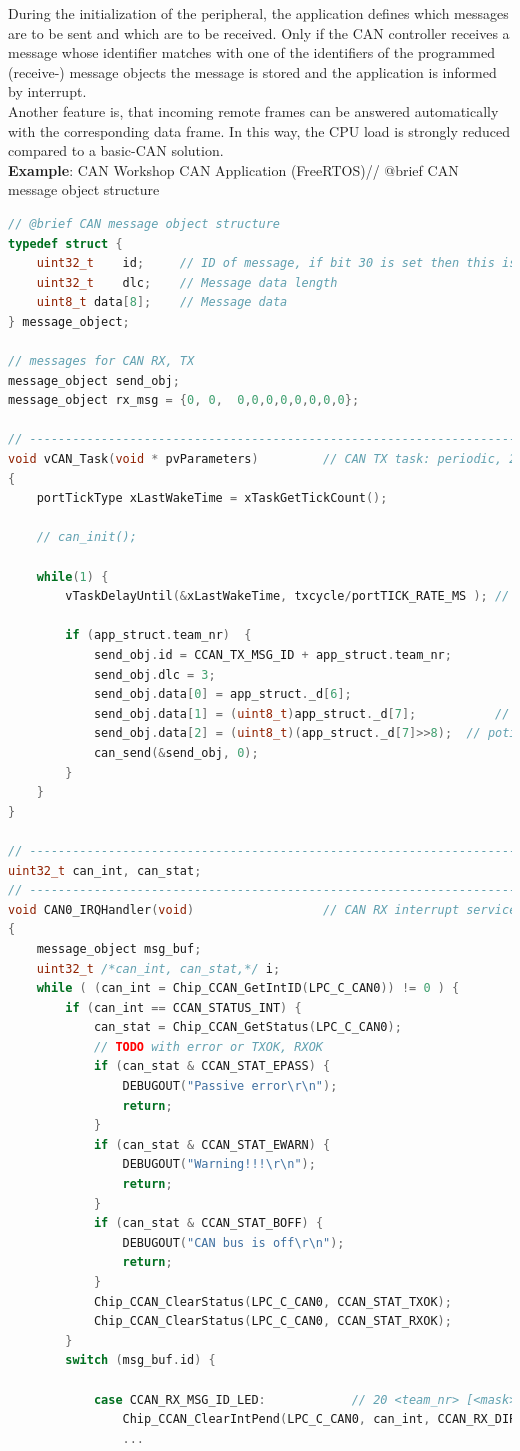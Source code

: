 During the initialization of the peripheral, the application defines which messages are to be sent and which are to be received. Only if the CAN controller receives a message whose identifier matches with one of the identifiers of the programmed (receive-) message objects the message is stored and the application is informed by interrupt. \\

Another feature is, that incoming remote frames can be answered automatically with the corresponding data frame. In this way, the CPU load is strongly reduced compared to a basic-CAN solution.\\
\newpage
\textbf{ Example}: CAN Workshop CAN Application (FreeRTOS)// @brief CAN message object structure\\

\begin{lstlisting}[style=mystyle, language=c]
// @brief CAN message object structure
typedef struct {
	uint32_t    id;		// ID of message, if bit 30 is set then this is extended frame */
	uint32_t    dlc;	// Message data length
	uint8_t data[8];	// Message data 
} message_object;

// messages for CAN RX, TX
message_object send_obj;
message_object rx_msg = {0, 0,  0,0,0,0,0,0,0,0};

// ----------------------------------------------------------------------------
void vCAN_Task(void * pvParameters) 		// CAN TX task: periodic, 20 ms
{
	portTickType xLastWakeTime = xTaskGetTickCount();

	// can_init();

	while(1) {
		vTaskDelayUntil(&xLastWakeTime, txcycle/portTICK_RATE_MS ); // 20 ms

		if (app_struct.team_nr)  {										// with team_nr set to > 0
			send_obj.id = CCAN_TX_MSG_ID + app_struct.team_nr;
			send_obj.dlc = 3; 												// 3 data bytes
			send_obj.data[0] = app_struct._d[6];						// joystick state
			send_obj.data[1] = (uint8_t)app_struct._d[7];			// poti LSB
			send_obj.data[2] = (uint8_t)(app_struct._d[7]>>8);	// poti MSB
			can_send(&send_obj, 0);
		}
	}	
}

// ----------------------------------------------------------------------------
uint32_t can_int, can_stat;					
// ----------------------------------------------------------------------------
void CAN0_IRQHandler(void) 					// CAN RX interrupt service routine:
{
	message_object msg_buf;
	uint32_t /*can_int, can_stat,*/ i;
	while ( (can_int = Chip_CCAN_GetIntID(LPC_C_CAN0)) != 0 ) {
		if (can_int == CCAN_STATUS_INT) {
			can_stat = Chip_CCAN_GetStatus(LPC_C_CAN0);
			// TODO with error or TXOK, RXOK
			if (can_stat & CCAN_STAT_EPASS) {
				DEBUGOUT("Passive error\r\n");
				return;
			}
			if (can_stat & CCAN_STAT_EWARN) {
				DEBUGOUT("Warning!!!\r\n");
				return;
			}
			if (can_stat & CCAN_STAT_BOFF) {
				DEBUGOUT("CAN bus is off\r\n");
				return;
			}
			Chip_CCAN_ClearStatus(LPC_C_CAN0, CCAN_STAT_TXOK);
			Chip_CCAN_ClearStatus(LPC_C_CAN0, CCAN_STAT_RXOK);
		} 
		switch (msg_buf.id) {

			case CCAN_RX_MSG_ID_LED:			// 20 <team_nr> [<mask>]
				Chip_CCAN_ClearIntPend(LPC_C_CAN0, can_int, CCAN_RX_DIR);
				...	
\end{lstlisting}

